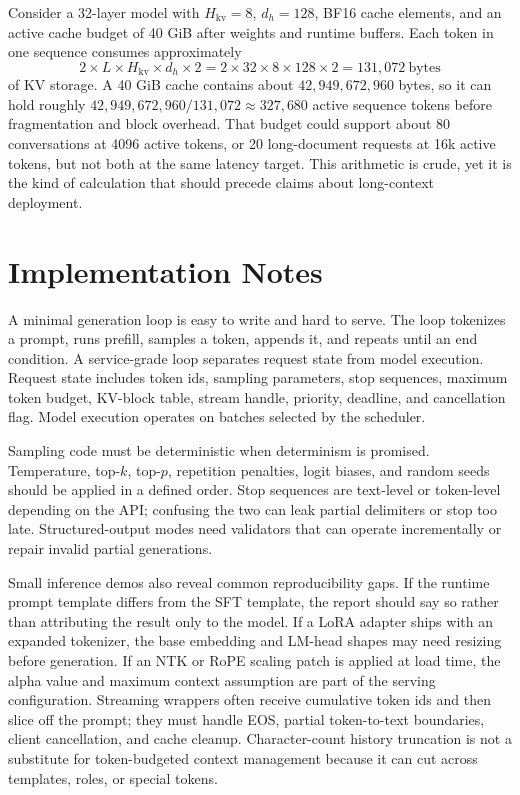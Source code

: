 Consider a 32-layer model with $H_{\mathrm{kv}}=8$, $d_h=128$, BF16 cache elements, and an active cache budget of 40 GiB after weights and runtime buffers. Each token in one sequence consumes approximately
\begin{equation}
  2 \times L \times H_{\mathrm{kv}} \times d_h \times 2
  =
  2 \times 32 \times 8 \times 128 \times 2
  =
  131{,}072 \ \mathrm{bytes}
\end{equation}
of KV storage. A 40 GiB cache contains about $42{,}949{,}672{,}960$ bytes, so it can hold roughly $42{,}949{,}672{,}960/131{,}072 \approx 327{,}680$ active sequence tokens before fragmentation and block overhead. That budget could support about 80 conversations at 4096 active tokens, or 20 long-document requests at 16k active tokens, but not both at the same latency target. This arithmetic is crude, yet it is the kind of calculation that should precede claims about long-context deployment.

\section{Implementation Notes}
\label{sec:serving-implementation-notes}

A minimal generation loop is easy to write and hard to serve. The loop tokenizes a prompt, runs prefill, samples a token, appends it, and repeats until an end condition. A service-grade loop separates request state from model execution. Request state includes token ids, sampling parameters, stop sequences, maximum token budget, KV-block table, stream handle, priority, deadline, and cancellation flag. Model execution operates on batches selected by the scheduler.

Sampling code must be deterministic when determinism is promised. Temperature, top-$k$, top-$p$, repetition penalties, logit biases, and random seeds should be applied in a defined order. Stop sequences are text-level or token-level depending on the API; confusing the two can leak partial delimiters or stop too late. Structured-output modes need validators that can operate incrementally or repair invalid partial generations.

Small inference demos also reveal common reproducibility gaps. If the runtime prompt template differs from the SFT template, the report should say so rather than attributing the result only to the model. If a LoRA adapter ships with an expanded tokenizer, the base embedding and LM-head shapes may need resizing before generation. If an NTK or RoPE scaling patch is applied at load time, the alpha value and maximum context assumption are part of the serving configuration. Streaming wrappers often receive cumulative token ids and then slice off the prompt; they must handle EOS, partial token-to-text boundaries, client cancellation, and cache cleanup. Character-count history truncation is not a substitute for token-budgeted context management because it can cut across templates, roles, or special tokens.

